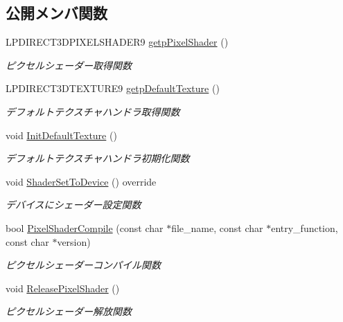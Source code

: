 \subsection*{公開メンバ関数}
\begin{DoxyCompactItemize}
\item 
L\+P\+D\+I\+R\+E\+C\+T3\+D\+P\+I\+X\+E\+L\+S\+H\+A\+D\+E\+R9 \mbox{\hyperlink{class_pixel_shader_base_ac71a02e257267d6f64397b7e30bda88f}{getp\+Pixel\+Shader}} ()
\begin{DoxyCompactList}\small\item\em ピクセルシェーダー取得関数 \end{DoxyCompactList}\item 
L\+P\+D\+I\+R\+E\+C\+T3\+D\+T\+E\+X\+T\+U\+R\+E9 \mbox{\hyperlink{class_pixel_shader_base_ad9a3a8966ab1e880df50596af730438e}{getp\+Default\+Texture}} ()
\begin{DoxyCompactList}\small\item\em デフォルトテクスチャハンドラ取得関数 \end{DoxyCompactList}\item 
void \mbox{\hyperlink{class_pixel_shader_base_af72a2206bace384df51f34393053cf1e}{Init\+Default\+Texture}} ()
\begin{DoxyCompactList}\small\item\em デフォルトテクスチャハンドラ初期化関数 \end{DoxyCompactList}\item 
void \mbox{\hyperlink{class_pixel_shader_base_a6cb7e981ff245b27a30f1943c28f2229}{Shader\+Set\+To\+Device}} () override
\begin{DoxyCompactList}\small\item\em デバイスにシェーダー設定関数 \end{DoxyCompactList}\item 
bool \mbox{\hyperlink{class_pixel_shader_base_ac572f1cb13a4486fc8bc2e60e5a14dc4}{Pixel\+Shader\+Compile}} (const char $\ast$file\+\_\+name, const char $\ast$entry\+\_\+function, const char $\ast$version)
\begin{DoxyCompactList}\small\item\em ピクセルシェーダーコンパイル関数 \end{DoxyCompactList}\item 
void \mbox{\hyperlink{class_pixel_shader_base_a8e00c19f5ece0a08762442f355195591}{Release\+Pixel\+Shader}} ()
\begin{DoxyCompactList}\small\item\em ピクセルシェーダー解放関数 \end{DoxyCompactList}\end{DoxyCompactItemize}
